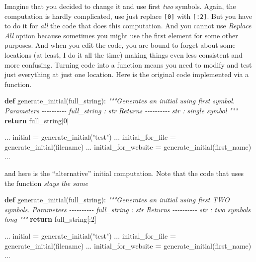 \documentclass[
]{book}
\newenvironment{Shaded}{\begin{snugshade}}{\end{snugshade}}
\newcommand{\CommentTok}[1]{\textcolor[rgb]{0.56,0.35,0.01}{\textit{#1}}}
\newcommand{\ControlFlowTok}[1]{\textcolor[rgb]{0.13,0.29,0.53}{\textbf{#1}}}
\newcommand{\DecValTok}[1]{\textcolor[rgb]{0.00,0.00,0.81}{#1}}
\newcommand{\KeywordTok}[1]{\textcolor[rgb]{0.13,0.29,0.53}{\textbf{#1}}}
\newcommand{\NormalTok}[1]{#1}
\newcommand{\OperatorTok}[1]{\textcolor[rgb]{0.81,0.36,0.00}{\textbf{#1}}}
\newcommand{\StringTok}[1]{\textcolor[rgb]{0.31,0.60,0.02}{#1}}
\begin{document}
Imagine that you decided to change it and use first \emph{two} symbols. Again, the computation is hardly complicated, use just replace \texttt{{[}0{]}} with \texttt{{[}:2{]}}. But you have to do it for \emph{all} the code that does this computation. And you cannot use \emph{Replace All} option because sometimes you might use the first element for some other purposes. And when you edit the code, you are bound to forget about some locations (at least, I do it all the time) making things even less consistent and more confusing. Turning code into a function means you need to modify and test just everything at just one location. Here is the original code implemented via a function.

\begin{Shaded}
\begin{Highlighting}[]
\KeywordTok{def}\NormalTok{ generate\_initial(full\_string):}
    \CommentTok{"""Generates an initial using first symbol.}
\CommentTok{    }
\CommentTok{    Parameters}
\CommentTok{    {-}{-}{-}{-}{-}{-}{-}{-}{-}{-}}
\CommentTok{    full\_string : str}
\CommentTok{    }
\CommentTok{    Returns}
\CommentTok{    {-}{-}{-}{-}{-}{-}{-}{-}{-}{-}}
\CommentTok{    str : single symbol}
\CommentTok{    """}
    \ControlFlowTok{return}\NormalTok{ full\_string[}\DecValTok{0}\NormalTok{]}

\NormalTok{...}
\NormalTok{initial }\OperatorTok{=}\NormalTok{ generate\_initial(}\StringTok{"test"}\NormalTok{)}
\NormalTok{...}
\NormalTok{initial\_for\_file }\OperatorTok{=}\NormalTok{ generate\_initial(filename)}
\NormalTok{...}
\NormalTok{initial\_for\_website }\OperatorTok{=}\NormalTok{ generate\_initial(first\_name)}
\NormalTok{...}
\end{Highlighting}
\end{Shaded}

and here is the ``alternative'' initial computation. Note that the code that uses the function \emph{stays the same}

\begin{Shaded}
\begin{Highlighting}[]
\KeywordTok{def}\NormalTok{ generate\_initial(full\_string):}
    \CommentTok{"""Generates an initial using first TWO symbols.}
\CommentTok{    }
\CommentTok{    Parameters}
\CommentTok{    {-}{-}{-}{-}{-}{-}{-}{-}{-}{-}}
\CommentTok{    full\_string : str}
\CommentTok{    }
\CommentTok{    Returns}
\CommentTok{    {-}{-}{-}{-}{-}{-}{-}{-}{-}{-}}
\CommentTok{    str : two symbols long}
\CommentTok{    """}
    \ControlFlowTok{return}\NormalTok{ full\_string[:}\DecValTok{2}\NormalTok{]}

\NormalTok{...}
\NormalTok{initial }\OperatorTok{=}\NormalTok{ generate\_initial(}\StringTok{"test"}\NormalTok{)}
\NormalTok{...}
\NormalTok{initial\_for\_file }\OperatorTok{=}\NormalTok{ generate\_initial(filename)}
\NormalTok{...}
\NormalTok{initial\_for\_website }\OperatorTok{=}\NormalTok{ generate\_initial(first\_name)}
\NormalTok{...}
\end{Highlighting}
\end{Shaded}
\end{document}
